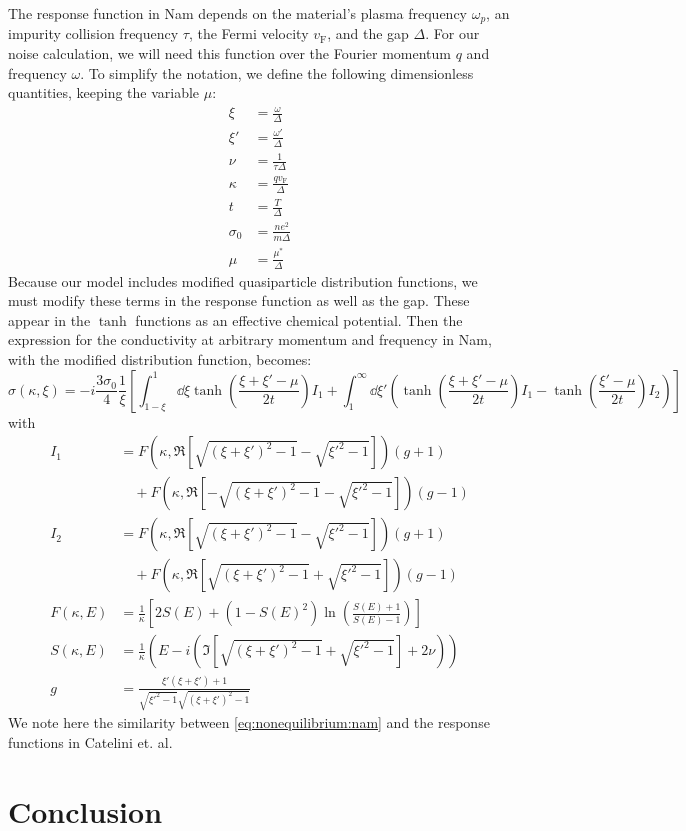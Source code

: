 \documentclass[%
 preprint,
 amsmath,amssymb,
 aps,
]{revtex4-2}
\newcommand{\vf}{v_{\mathrm{F}}}
\newcommand{\corr}{\mu^{\ast}}
\begin{document}
The response function in Nam depends on the material's plasma frequency $\omega_p$, an impurity collision frequency $\tau$, the Fermi velocity $\vf$, and the gap $\Delta$.
For our noise calculation, we will need this function over the Fourier momentum $q$ and frequency $\omega$.
To simplify the notation, we define the following dimensionless quantities, keeping the variable $\mu$:
\begin{align}
	\xi &= \frac{\omega}{\Delta} \\
	\xi' &= \frac{\omega'}{\Delta} \\
	\nu &= \frac{1}{\tau \Delta} \\
	\kappa &= \frac{q \vf}{\Delta} \\
	t &= \frac{T}{\Delta} \\
	\sigma_0 &= \frac{n e^2}{m \Delta} \\
	\mu &= \frac{\corr}{\Delta}
\end{align}
Because our model includes modified quasiparticle distribution functions, we must modify these terms in the response function as well as the gap.
These appear in the $\tanh$ functions as an effective chemical potential. %
Then the expression for the conductivity at arbitrary momentum and frequency in Nam\cite{Nam1967}, with the modified distribution function, becomes:
\begin{equation}
	\sigma(\kappa, \xi) = -i \frac{3 \sigma_0}{4} \frac{1}{\xi}\left[\int_{1 - \xi}^{1}\dd{\xi} \tanh(\frac{\xi + \xi' - \mu}{2 t}) I_1 + \int_{1}^{\infty} \dd{\xi'} \left( \tanh(\frac{\xi + \xi' - \mu}{2t}) I_1  - \tanh(\frac{\xi' - \mu}{2t})I_2 \right) \right] \label{eq:nonequilibrium:nam}
\end{equation}
with
\begin{align}
	I_1 &= F(\kappa, \Re[\sqrt{(\xi + \xi')^2 - 1} - \sqrt{\xi'^2 - 1}]) (g + 1) \nonumber\\
	&\quad + F(\kappa, \Re[-\sqrt{(\xi + \xi')^2 - 1} - \sqrt{\xi'^2 - 1}]) (g - 1) \\
	I_2 &= F(\kappa, \Re[\sqrt{(\xi + \xi')^2 - 1} - \sqrt{\xi'^2 - 1}]) (g + 1) \nonumber\\
	&\quad + F(\kappa, \Re[\sqrt{(\xi + \xi')^2 - 1} + \sqrt{\xi'^2 - 1}]) (g - 1) \\
	F(\kappa, E) &= \frac{1}{\kappa} \left[2 S(E) + (1 - S(E)^2)\ln(\frac{S(E) + 1}{S(E) - 1})\right]  \\
	S(\kappa, E) &= \frac{1}{\kappa} \left(E - i \left(\Im[\sqrt{(\xi + \xi')^2 - 1} + \sqrt{\xi'^2 - 1}] + 2 \nu \right) \right) \\
	g  &= \frac{\xi' \left( \xi + \xi'\right) + 1}{\sqrt{\xi'^2 - 1}\sqrt{(\xi + \xi')^2 - 1}}
\end{align}
We note here the similarity between \eqref{eq:nonequilibrium:nam} and the response functions in Catelini et. al\cite{Catelani2010}.

\section{Conclusion} \label{sec:conclusion}


\end{document}
